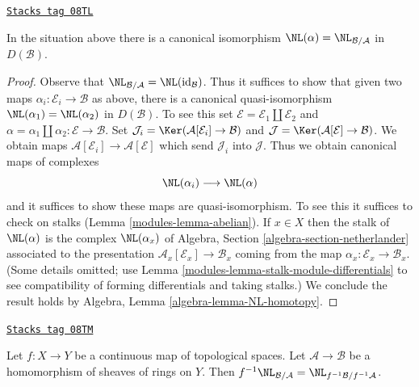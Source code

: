 \begin{lemma}[NL up to qis]
\label{modules-lemma-NL-up-to-qis}
\href{https://stacks.math.columbia.edu/tag/08TL}{\texttt{Stacks tag 08TL}}

In the situation above there is a canonical isomorphism
$\NL(\alpha) = \NL_{\mathcal{B}/\mathcal{A}}$ in $D(\mathcal{B})$.
\end{lemma}

\begin{proof}

Observe that $\NL_{\mathcal{B}/\mathcal{A}} = \NL(\text{id}_\mathcal{B})$.
Thus it suffices to show that given two maps
$\alpha_i : \mathcal{E}_i \to \mathcal{B}$ as above, there is a
canonical quasi-isomorphism $\NL(\alpha_1) = \NL(\alpha_2)$ in $D(\mathcal{B})$.
To see this set $\mathcal{E} = \mathcal{E}_1 \amalg \mathcal{E}_2$ and
$\alpha = \alpha_1 \amalg \alpha_2 : \mathcal{E} \to \mathcal{B}$.
Set
$\mathcal{J}_i = \Ker(\mathcal{A}[\mathcal{E}_i] \to \mathcal{B})$
and
$\mathcal{J} = \Ker(\mathcal{A}[\mathcal{E}] \to \mathcal{B})$.
We obtain maps $\mathcal{A}[\mathcal{E}_i] \to \mathcal{A}[\mathcal{E}]$
which send $\mathcal{J}_i$ into $\mathcal{J}$.
Thus we obtain canonical maps of complexes
$$
\NL(\alpha_i) \longrightarrow \NL(\alpha)
$$
and it suffices to show these maps are quasi-isomorphism. To see this
it suffices to check on stalks (Lemma \ref{modules-lemma-abelian}). If $x \in X$
then the stalk of $\NL(\alpha)$ is the complex $\NL(\alpha_x)$ of
Algebra, Section \ref{algebra-section-netherlander}
associated to the presentation $\mathcal{A}_x[\mathcal{E}_x] \to \mathcal{B}_x$
coming from the map $\alpha_x : \mathcal{E}_x \to \mathcal{B}_x$.
(Some details omitted; use Lemma \ref{modules-lemma-stalk-module-differentials}
to see compatibility of forming differentials and taking stalks.)
We conclude the result holds by
Algebra, Lemma \ref{algebra-lemma-NL-homotopy}.
\end{proof}

\begin{lemma}[Pullback NL]
\label{modules-lemma-pullback-NL}
\href{https://stacks.math.columbia.edu/tag/08TM}{\texttt{Stacks tag 08TM}}

Let $f : X \to Y$ be a continuous map of topological spaces.
Let $\mathcal{A} \to \mathcal{B}$ be a homomorphism of sheaves of rings
on $Y$. Then $f^{-1}\NL_{\mathcal{B}/\mathcal{A}} =
\NL_{f^{-1}\mathcal{B}/f^{-1}\mathcal{A}}$.
\end{lemma}

